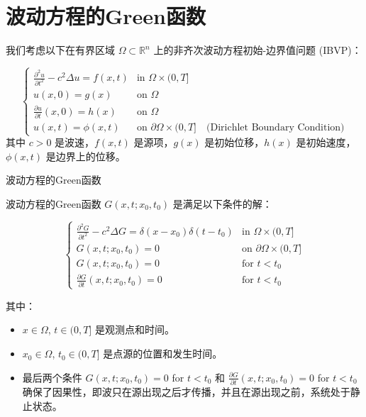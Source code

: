 \documentclass[../../main.tex]{subfiles}
\begin{document}
 \section{波动方程的Green函数}

我们考虑以下在有界区域 $\Omega \subset \mathbb{R}^n$ 上的非齐次波动方程初始-边界值问题 (IBVP)：

$$ \begin{cases} \frac{\partial^2 u}{\partial t^2} - c^2 \Delta u = f(x,t) & \text{in } \Omega \times (0, T] \\ u(x,0) = g(x) & \text{on } \Omega \\ \frac{\partial u}{\partial t}(x,0) = h(x) & \text{on } \Omega \\ u(x,t) = \phi(x,t) & \text{on } \partial \Omega \times (0, T] \quad \text{(Dirichlet Boundary Condition)} \end{cases} $$
其中 $c>0$ 是波速，$f(x,t)$ 是源项，$g(x)$ 是初始位移，$h(x)$ 是初始速度，$\phi(x,t)$ 是边界上的位移。


\begin{definition}{波动方程的Green函数}
    
波动方程的Green函数 $G(x,t; x_0, t_0)$ 是满足以下条件的解：

$$ \begin{cases} \frac{\partial^2 G}{\partial t^2} - c^2 \Delta G = \delta(x - x_0) \delta(t - t_0) & \text{in } \Omega \times (0, T] \\ G(x,t; x_0, t_0) = 0 & \text{on } \partial \Omega \times (0, T] \\ G(x,t; x_0, t_0) = 0 & \text{for } t < t_0 \\ \frac{\partial G}{\partial t}(x,t; x_0, t_0) = 0 & \text{for } t < t_0 \end{cases} $$

其中：
\begin{itemize}
    \item $x \in \Omega$, $t \in (0, T]$ 是观测点和时间。
    \item $x_0 \in \Omega$, $t_0 \in (0, T]$ 是点源的位置和发生时间。
    \item 最后两个条件 $G(x,t; x_0, t_0) = 0$ for $t < t_0$ 和 $\frac{\partial G}{\partial t}(x,t; x_0, t_0) = 0$ for $t < t_0$ 确保了因果性，即波只在源出现之后才传播，并且在源出现之前，系统处于静止状态。

\end{itemize}

\end{definition}
\end{document}
